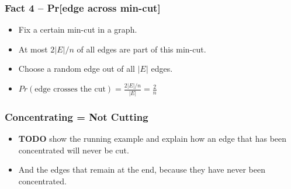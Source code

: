 \begin{frame}
  \frametitle{Fact 4 -- Pr[edge across min-cut]}

  \begin{itemize}
    \item Fix a certain min-cut in a graph.
    \item At most $2|E|/n$ of all edges are part of this min-cut.
    \item Choose a random edge out of all $|E|$ edges.
    \item $Pr(\text{edge crosses the cut}) = \frac{2|E|/n}{|E|} = \frac{2}{n}$
  \end{itemize}

\end{frame}


\begin{frame}
  \frametitle{Concentrating = Not Cutting}
  \begin{itemize}
  \item {\bf\large TODO} show the running example and explain how an
    edge that has been concentrated will never be cut.
  \item And the edges that remain at the end, because they have never
    been concentrated.
  \end{itemize}
\end{frame}

